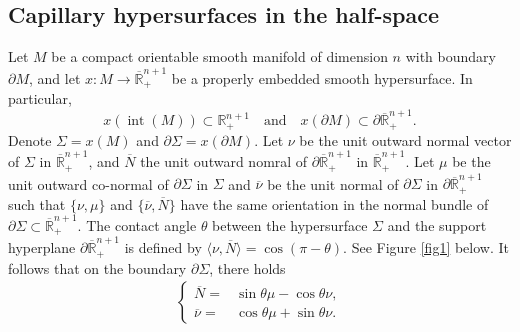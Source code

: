 \documentclass[11pt,reqno]{amsart}
\theoremstyle{definition}
\theoremstyle{remark}
\numberwithin{equation}{section}
\renewcommand{\(}{\left(}
\renewcommand{\)}{\right)}
\renewcommand{\-}{\overline}
\renewcommand{\t}{\theta}
\newcommand{\ra}{\rightarrow}
\begin{document}
\subsection{Capillary hypersurfaces in the half-space}
Let $M$ be a compact orientable smooth manifold of dimension $n$ with boundary $\partial M$, and let $x:M\ra \-{\mathbb R}^{n+1}_{+}$ be a properly embedded smooth hypersurface. In particular,
$$
x(\operatorname{int}(M))\subset \mathbb R^{n+1}_{+} \quad \text{and}\quad  x(\partial M)\subset \partial \-{\mathbb R}_{+}^{n+1}.
$$
Denote $\Sigma=x(M)$ and $\partial \Sigma=x(\partial M)$. Let $\nu$ be the unit outward normal vector of $\Sigma$ in $\overline{\mathbb R}^{n+1}_{+}$, and $\-N$ the unit outward nomral of $\partial \-{\mathbb R}_{+}^{n+1}$ in $\-{\mathbb R}_{+}^{n+1}$. Let $\mu$ be the unit outward co-normal of $\partial \Sigma$ in $\Sigma$ and $\-\nu$ be the unit normal of $\partial \Sigma$ in $\partial \-{\mathbb R}^{n+1}_{+}$ such that $\{\nu,\mu\}$ and $\{\-\nu,\-N\}$ have the same orientation in the normal bundle of $\partial \Sigma \subset \-{\mathbb R}^{n+1}_{+}$. The contact angle $\t$ between the hypersurface $\Sigma$ and the support hyperplane $\partial \-{\mathbb R}^{n+1}_{+}$ is defined by $\langle \nu,\-N\rangle=\cos(\pi-\t)$. See Figure \ref{fig1} below. It follows that on the boundary $\partial \Sigma$, there holds
\begin{align}\label{s2:relation-normal}
\left\{\begin{aligned}\-N= &\sin\t \mu-\cos \t \nu, \\
\-\nu=&\cos \t \mu+\sin \t \nu.
\end{aligned}\right.
\end{align}
\end{document}
